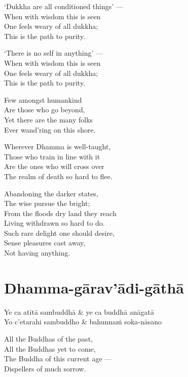 `Dukkha are all conditioned things' ---\\
When with wisdom this is seen\\
One feels weary of all dukkha;\\
This is the path to purity.

`There is no self in anything' ---\\
When with wisdom this is seen\\
One feels weary of all dukkha;\\
This is the path to purity.

Few amongst humankind\\
Are those who go beyond,\\
Yet there are the many folks\\
Ever wand'ring on this shore.

Wherever Dhamma is well-taught,\\
Those who train in line with it\\
Are the ones who will cross over\\
The realm of death so hard to flee.

Abandoning the darker states,\\
The wise pursue the bright;\\
From the floods dry land they reach\\
Living withdrawn so hard to do.\\
Such rare delight one should desire,\\
Sense pleasures cast away,\\
Not having anything.

\section{Dhamma-gārav'ādi-gāthā}



\begin{twochants}
  Ye ca atītā sambuddhā & ye ca buddhā anāgatā \\
  Yo c'etarahi sambuddho & bahunnaṁ soka-nāsano \\
\end{twochants}

\begin{english}
  All the Buddhas of the past,\\
  All the Buddhas yet to come,\\
  The Buddha of this current age ---\\
  Dispellers of much sorrow.
\end{english}

